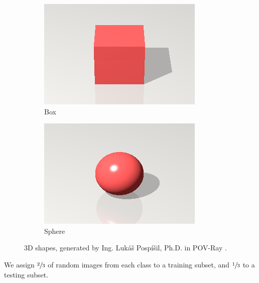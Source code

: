 \begin{figure}[ht]
    \centering
    \begin{subfigure}[t]{0.3\textwidth}
        \includegraphics[width=\textwidth]{Figures/datasets/box.png}
        \caption{Box}
    \end{subfigure}
    \begin{subfigure}[t]{0.3\textwidth}
        \includegraphics[width=\textwidth]{Figures/datasets/sphere.png}
        \caption{Sphere}
    \end{subfigure}
    \caption[3D shapes, generated by Ing. Lukáš Pospíšil, Ph.D. in POV-Ray]{3D shapes, generated by Ing. Lukáš Pospíšil, Ph.D. in POV-Ray \cite{povray}.}
    \label{fig:3d_shapes}
\end{figure}

We assign $\sfrac{2}{3}$ of random images from each class to a training subset, and $\sfrac{1}{3}$ to a testing subset.

